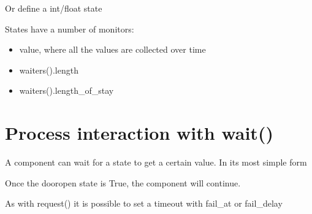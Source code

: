 \documentclass[letterpaper,10pt,english]{sphinxmanual}
\begin{document}
Or define a int/float state

\begin{sphinxVerbatim}[commandchars=\\\{\}]
 
\end{sphinxVerbatim}

States have a number of monitors:
\begin{itemize}
\item {} 
value, where all the values are collected over time

\item {} 
waiters().length

\item {} 
waiters().length\_of\_stay

\end{itemize}


\section{Process interaction with wait()}
\label{\detokenize{State:process-interaction-with-wait}}
A component can wait for a state to get a certain value. In its most simple form

\begin{sphinxVerbatim}[commandchars=\\\{\}]
 
\end{sphinxVerbatim}

Once the dooropen state is True, the component will continue.

As with request() it is possible to set a timeout with fail\_at or fail\_delay

\begin{sphinxVerbatim}[commandchars=\\\{\}]
  
 
\end{sphinxVerbatim}
\end{document}
